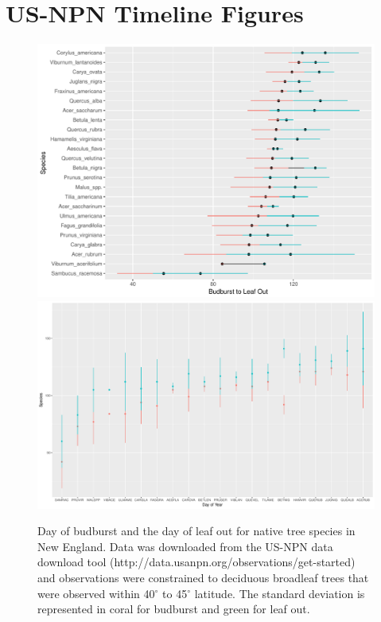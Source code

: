 \documentclass{article}\usepackage[]{graphicx}\usepackage[]{color}
\begin{document}
\renewcommand{\thetable}{\arabic{table}}
\renewcommand{\thefigure}{\arabic{figure}}
\renewcommand{\labelitemi}{$-$}
\section*{US-NPN Timeline Figures}

\begin{figure} [H]
\begin{center}
\caption{Day of budburst and the day of leaf out for native tree species in New England. Data was downloaded from the US-NPN data download tool (http://data.usanpn.org/observations/get-started) and observations were constrained to deciduous broadleaf trees that were observed within 40$^{\circ}$ to 45$^{\circ}$ latitude. The standard deviation is represented in coral for budburst and green for leaf out. }
\includegraphics{..//figure/NPN_2016.pdf} 
\includegraphics{..//figure/NPN_2016_sd.pdf} 
\end{center}
\end{figure}
\end{document}
